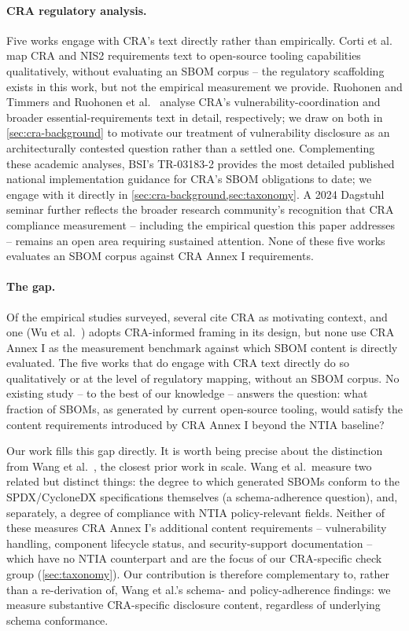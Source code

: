 \documentclass[11pt]{article}
\begin{document}
\paragraph{CRA regulatory analysis.} Five works engage with CRA's text directly rather than empirically. Corti et al.\ \cite{corti2025} map CRA and NIS2 requirements text to open-source tooling capabilities qualitatively, without evaluating an SBOM corpus -- the regulatory scaffolding exists in this work, but not the empirical measurement we provide. Ruohonen and Timmers \cite{ruohonen2025timmers} and Ruohonen et al.\ \cite{ruohonen2025gdpr} analyse CRA's vulnerability-coordination and broader essential-requirements text in detail, respectively; we draw on both in \cref{sec:cra-background} to motivate our treatment of vulnerability disclosure as an architecturally contested question rather than a settled one. Complementing these academic analyses, BSI's TR-03183-2 \cite{bsi2025} provides the most detailed published national implementation guidance for CRA's SBOM obligations to date; we engage with it directly in \cref{sec:cra-background,sec:taxonomy}. A 2024 Dagstuhl seminar \cite{dagstuhl2024} further reflects the broader research community's recognition that CRA compliance measurement -- including the empirical question this paper addresses -- remains an open area requiring sustained attention. None of these five works evaluates an SBOM corpus against CRA Annex I requirements.

\paragraph{The gap.} Of the empirical studies surveyed, several cite CRA as motivating context, and one (Wu et al.\ \cite{wu2025}) adopts CRA-informed framing in its design, but none use CRA Annex I as the measurement benchmark against which SBOM content is directly evaluated. The five works that do engage with CRA text directly do so qualitatively or at the level of regulatory mapping, without an SBOM corpus. No existing study -- to the best of our knowledge -- answers the question: what fraction of SBOMs, as generated by current open-source tooling, would satisfy the content requirements introduced by CRA Annex I beyond the NTIA baseline?

Our work fills this gap directly. It is worth being precise about the distinction from Wang et al.\ \cite{wang2026}, the closest prior work in scale. Wang et al.\ measure two related but distinct things: the degree to which generated SBOMs conform to the SPDX/CycloneDX specifications themselves (a schema-adherence question), and, separately, a degree of compliance with NTIA policy-relevant fields. Neither of these measures CRA Annex I's additional content requirements -- vulnerability handling, component lifecycle status, and security-support documentation -- which have no NTIA counterpart and are the focus of our CRA-specific check group (\cref{sec:taxonomy}). Our contribution is therefore complementary to, rather than a re-derivation of, Wang et al.'s schema- and policy-adherence findings: we measure substantive CRA-specific disclosure content, regardless of underlying schema conformance.
\end{document}
